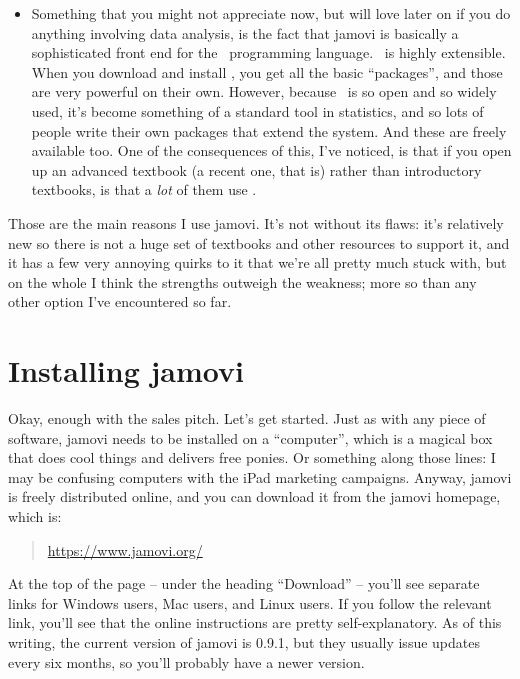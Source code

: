 \begin{itemize}
\item Something that you might not appreciate now, but will love later on if you do anything involving data analysis, is the fact that jamovi is basically a sophisticated front end for the \R\ programming language. \R\ is highly extensible. When you download and install \R, you get all the basic ``packages'', and those are very powerful on their own. However, because \R\ is so open and so widely used, it's become something of a standard tool in statistics, and so lots of people write their own packages that extend the system. And these are freely available too. One of the consequences of this, I've noticed, is that if you open up an advanced textbook (a recent one, that is) rather than introductory textbooks, is that a {\it lot} of them use \R. 
\end{itemize}
Those are the main reasons I use jamovi. It's not without its flaws: it's relatively new so there is not a huge set of textbooks and other resources to support it, and it has a few very annoying quirks to it that we're all pretty much stuck with, but on the whole I think the strengths outweigh the weakness; more so than any other option I've encountered so far. 



\section{Installing jamovi \label{sec:gettingjamovi}}

Okay, enough with the sales pitch. Let's get started. Just as with any piece of software,  jamovi needs to be installed on a ``computer'', which is a magical box that does cool things and delivers free ponies. Or something along those lines: I may be confusing computers with the iPad marketing campaigns. Anyway, jamovi is freely distributed online, and you can download it from the jamovi homepage, which is:
\begin{quote}
\url{https://www.jamovi.org/}
\end{quote}
At the top of the page -- under the heading ``Download'' -- you'll see separate links for Windows users, Mac users, and Linux users. If you follow the relevant link, you'll see that the online instructions are pretty self-explanatory. As of this writing, the current version of  jamovi is 0.9.1, but they usually issue updates every six months, so you'll probably have a newer version.

